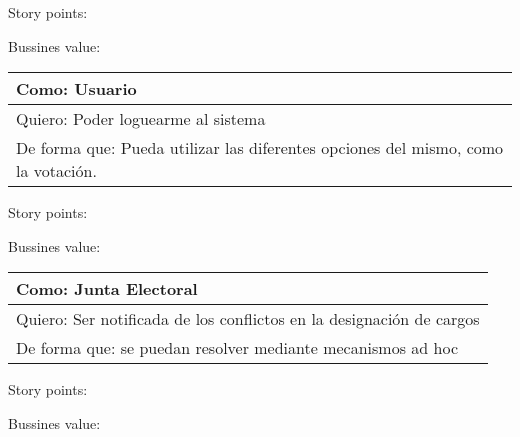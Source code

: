\medskip
Story points:

\medskip
Bussines value:


\bigskip

\begin{tabular}{|l|}
\hline
Como: Usuario\\
\hline
Quiero: Poder loguearme al sistema\\
\hline
De forma que: Pueda utilizar las diferentes opciones del mismo, como la votaci\'on. \\
\hline
\end{tabular}

\medskip
Story points:

\medskip
Bussines value:


\bigskip

\begin{tabular}{|l|}
\hline
Como: Junta Electoral\\
\hline
Quiero: Ser notificada de los conflictos en la designaci\'on de cargos\\
\hline
De forma que: se puedan resolver mediante mecanismos ad hoc \\
\hline
\end{tabular}

\medskip
Story points:

\medskip
Bussines value:
